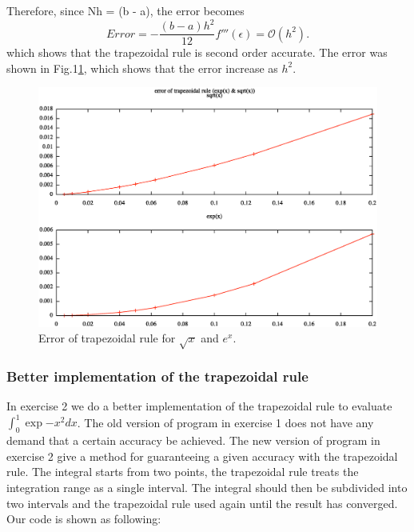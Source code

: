 \documentclass{article}
\begin{document}
Therefore, since Nh = (b - a), the error becomes
\begin{equation}
Error = -\frac{(b - a)h^2}{12}f'''(\epsilon) =  \mathcal{O}(h^2).
\end{equation}
which shows that the trapezoidal rule is second order accurate. The error was shown in Fig.1{\ref{fig0}}, which shows that the error increase as $h^2$.
\begin{figure}
    \centering
    \includegraphics[width=4.7in]{error.eps}
    \caption{Error of trapezoidal rule for $\sqrt{x}$  and $e^x$.}
    \label{fig0}
\end{figure}


\subsubsection{Better implementation of the trapezoidal rule}

In exercise 2 we do a better implementation of the trapezoidal rule to evaluate $\int_{0}^{1} \exp{-x^2}dx$. The old version of program in exercise 1 does not have any demand that a certain accuracy be achieved. The new version of program in exercise 2 give a method for guaranteeing a given accuracy with the trapezoidal rule. The integral starts from two points, the trapezoidal rule treats the integration range as a single interval. The integral should then be subdivided into two intervals and the trapezoidal rule used again until the result has converged. Our code is shown as following:
\end{document}
